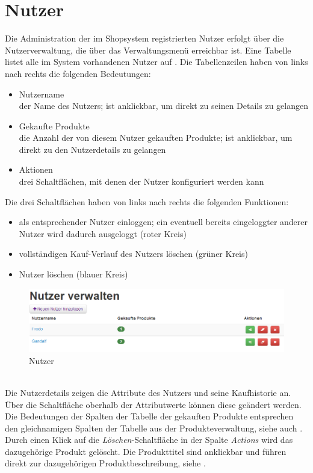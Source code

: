 \section{Nutzer}
\label{chp:Nutzer}
Die Administration der im Shopsystem registrierten Nutzer erfolgt über die Nutzerverwaltung, die über das Verwaltungsmenü erreichbar ist. Eine Tabelle listet alle im System vorhandenen Nutzer auf . Die Tabellenzeilen haben von links nach rechts die folgenden Bedeutungen:
\begin{itemize}
  \item Nutzername \\
        der Name des Nutzers; ist anklickbar, um direkt zu seinen Details zu gelangen
  \vspace*{-0.5em}
  \item Gekaufte Produkte \\
        die Anzahl der von diesem Nutzer gekauften Produkte; ist anklickbar, um direkt zu den Nutzerdetails zu gelangen
  \vspace*{-0.5em}
  \item Aktionen \\
        drei Schaltflächen, mit denen der Nutzer konfiguriert werden kann
\end{itemize}
Die drei Schaltflächen haben von links nach rechts die folgenden Funktionen:
\begin{itemize}
  \item als entsprechender Nutzer einloggen; ein eventuell bereits eingeloggter anderer Nutzer wird dadurch ausgeloggt (roter Kreis)
  \vspace*{-0.5em}
  \item vollständigen Kauf-Verlauf des Nutzers löschen (grüner Kreis)
  \vspace*{-0.5em}
  \item Nutzer löschen (blauer Kreis)
\end{itemize}

\begin{figure}[h!]
  \centering
  \includegraphics[width=\textwidth]{img/Nutzer.png}
  \caption{Nutzer}
  \label{fig:Nutzer}
\end{figure}
\text{}\vspace*{-1em}\\
Die Nutzerdetails  zeigen die Attribute des Nutzers und seine Kaufhistorie an. Über die Schaltfläche oberhalb der Attributwerte können diese ge\-än\-dert werden. Die Bedeutungen der Spalten der Tabelle der gekauften Produkte entsprechen den gleichnamigen Spalten der Tabelle aus der Produkteverwaltung, siehe auch . Durch einen Klick auf die \textit{Löschen}-Schaltfläche in der Spalte \textit{Actions} wird das dazugehörige Produkt gelöscht. Die Produkttitel sind anklickbar und führen direkt zur dazugehörigen Produktbeschreibung, siehe .

